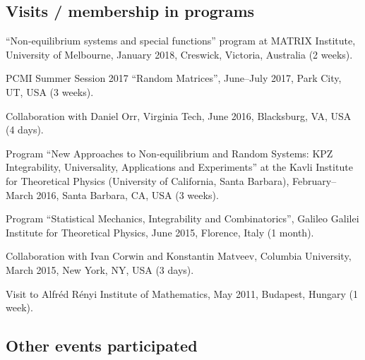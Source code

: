 \documentclass[letterpaper,11pt]{article}
\begin{document}
\subsection*{Visits / membership in programs}

\begin{etaremune}
	\item 
		``Non-equilibrium systems and special functions'' program at MATRIX Institute,
		University of Melbourne, 
		January 2018, 
		Creswick, Victoria, Australia (2 weeks).
	\item
	      PCMI Summer Session 2017 ``Random Matrices'', June--July 2017,
	      Park City, UT, USA (3 weeks).
	\item
	      Collaboration with Daniel Orr, Virginia Tech, June 2016,
	      Blacksburg, VA, USA (4 days).
	\item
	      Program ``New Approaches to Non-equilibrium and Random Systems:
	      KPZ Integrability, Universality, Applications and Experiments'' at the Kavli
	      Institute for Theoretical Physics (University of California, Santa Barbara),
	      February--March 2016, Santa Barbara, CA, USA (3 weeks).
	\item
	      Program ``Statistical Mechanics, Integrability and
	      Combinatorics'', Galileo Galilei Institute for Theoretical Physics, June 2015,
	      Florence, Italy (1 month).
	\item
	      Collaboration with Ivan Corwin and Konstantin Matveev, Columbia
	      University, March 2015, New York, NY, USA (3 days).
	\item
	      Visit to Alfr\'ed R\'enyi Institute of Mathematics, May 2011,
	      Budapest, Hungary (1 week).
\end{etaremune}

\subsection*{Other events participated}
\end{document}
